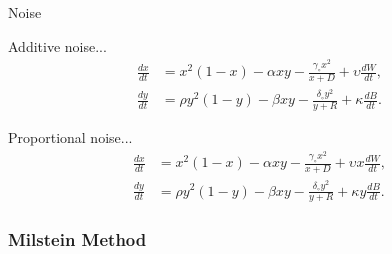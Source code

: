 \begin{frame}{Noise}

  Additive noise...
  \begin{align*}
    \frac{dx}{dt} &= x^2 (1-x) - \alpha xy - \frac{\gamma_\circ x^2}{x+D} + \upsilon \frac{dW}{dt}, \\
    \frac{dy}{dt} &= \rho y^2 (1-y) - \beta xy -\frac{\delta_\circ y^2}{y+R}+ \kappa \frac{dB}{dt}.
  \end{align*}

  Proportional noise...
  \begin{align*}
    \frac{dx}{dt} &= x^2 (1-x) - \alpha xy - \frac{\gamma_\circ x^2}{x+D} + \upsilon x \frac{dW}{dt}, \\
    \frac{dy}{dt} &= \rho y^2 (1-y) - \beta xy -\frac{\delta_\circ y^2}{y+R}+ \kappa y \frac{dB}{dt}.
  \end{align*}

\end{frame}


\begin{frame}
  \frametitle{Milstein Method}

\begin{center}
\end{center}

\vfill
\end{frame}

